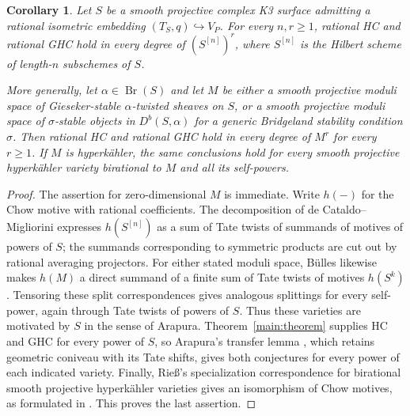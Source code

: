 \documentclass[11pt]{amsart}
\newtheorem{corollary}[theorem]{Corollary}
\theoremstyle{definition}
\theoremstyle{remark}
\numberwithin{equation}{section}
\begin{document}
\begin{corollary}\label{transfer:moduli}
Let $S$ be a smooth projective complex K3 surface admitting a rational
isometric embedding $(T_S,q)\hookrightarrow V_P$.
For every $n,r\ge1$, rational HC and rational GHC hold in every degree
of $(S^{[n]})^r$, where $S^{[n]}$ is the Hilbert scheme of length-$n$
subschemes of $S$.

More generally, let $\alpha\in\operatorname{Br}(S)$ and let $M$ be either
a smooth projective moduli space of Gieseker-stable $\alpha$-twisted
sheaves on $S$, or a smooth projective moduli space of $\sigma$-stable
objects in $D^b(S,\alpha)$ for a generic Bridgeland stability condition
$\sigma$.
Then rational HC and rational GHC hold in every degree of $M^r$ for
every $r\ge1$.  If $M$ is hyperk\"ahler, the same conclusions hold for
every smooth projective hyperk\"ahler variety birational to $M$ and all
its self-powers.
\end{corollary}
\begin{proof}
The assertion for zero-dimensional $M$ is immediate.
Write $h(-)$ for the Chow motive with rational coefficients.
The decomposition of de Cataldo--Migliorini
\cite[Theorem~6.2.1]{deCataldoMigliorini} expresses $h(S^{[n]})$ as
a sum of Tate twists of summands of motives of powers of $S$; the
summands corresponding to symmetric products are cut out by rational
averaging projectors.  For either stated moduli space, B\"ulles
\cite[Theorem~0.1]{BullesModuli} likewise makes $h(M)$ a direct summand
of a finite sum of Tate twists of motives $h(S^k)$.
Tensoring these split correspondences gives analogous splittings for
every self-power, again through Tate twists of powers of $S$.
Thus these varieties are motivated by $S$ in the sense of Arapura.
Theorem~\ref{main:theorem} supplies HC and GHC for every power of $S$,
so Arapura's transfer lemma \cite[Lemma~4.2]{ArapuraMotivation},
which retains geometric coniveau with its Tate shifts, gives both
conjectures for every power of each indicated variety.
Finally, Rie\ss's specialization
correspondence for birational smooth projective hyperk\"ahler varieties
\cite[Theorem~3.2 and Section~3.3]{RiessBirational} gives an isomorphism
of Chow motives, as formulated in
\cite[Proposition~1.4]{BullesModuli}.  This proves the last assertion.
\end{proof}
\end{document}
